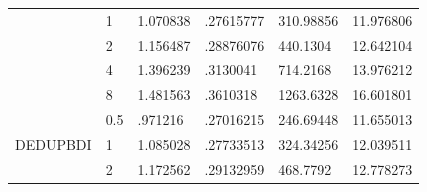 \begin{table}[]
{\begin{tabular}{llllll}
    \multicolumn{1}{l|}{}                          & \multicolumn{1}{l|}{1}   & 1.070838                                                                          & .27615777                                                                              & 310.98856                                                                        & 11.976806                      \\
    \multicolumn{1}{l|}{}                          & \multicolumn{1}{l|}{2}   & 1.156487                                                                          & .28876076                                                                              & 440.1304                                                                         & 12.642104                      \\
    \multicolumn{1}{l|}{}                          & \multicolumn{1}{l|}{4}   & 1.396239                                                                          & .3130041                                                                               & 714.2168                                                                         & 13.976212                      \\
    \multicolumn{1}{l|}{}                          & \multicolumn{1}{l|}{8}   & 1.481563                                                                          & .3610318                                                                               & 1263.6328                                                                        & 16.601801                      \\ \cline{1-2}
    \multicolumn{1}{c|}{\multirow{5}{*}{DEDUPBDI}} & \multicolumn{1}{l|}{0.5} & .971216                                                                           & .27016215                                                                              & 246.69448                                                                        & 11.655013                      \\
    \multicolumn{1}{c|}{}                          & \multicolumn{1}{l|}{1}   & 1.085028                                                                          & .27733513                                                                              & 324.34256                                                                        & 12.039511                      \\
    \multicolumn{1}{c|}{}                          & \multicolumn{1}{l|}{2}   & 1.172562                                                                          & .29132959                                                                              & 468.7792                                                                         & 12.778273                      \\

\end{tabular}}
\end{table}
